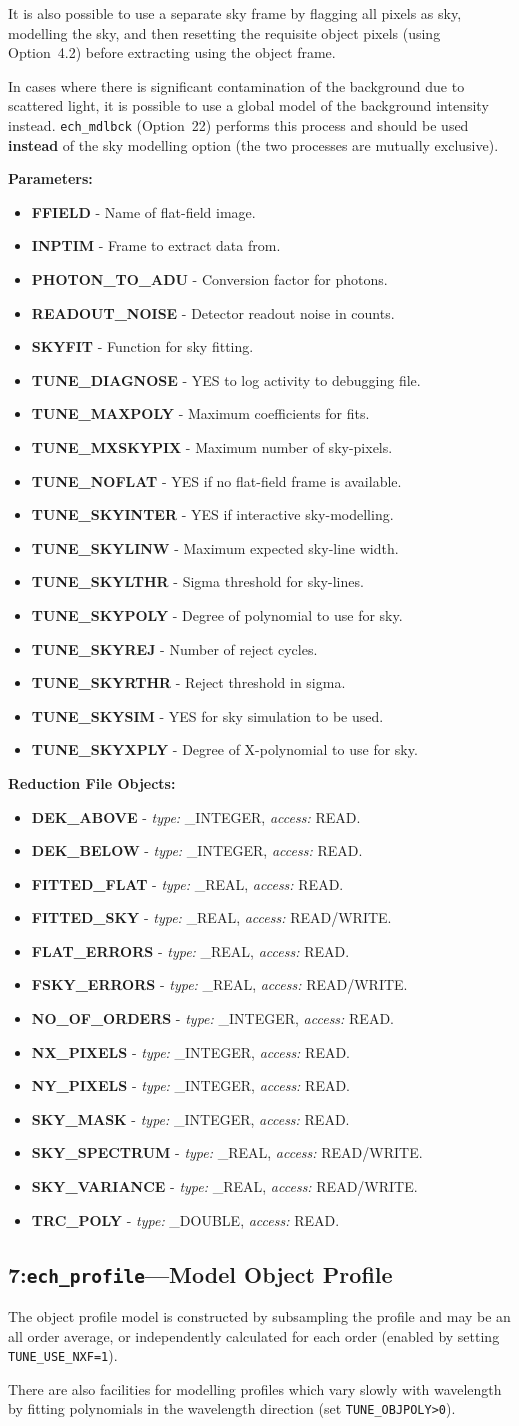 \documentclass[11pt,twoside]{article}
\makeatletter
\newcommand{\stardocinitials}  {SUN}
\newcommand{\stardocnumber}    {152.4}
\newcommand{\stardocname}{\stardocinitials /\stardocnumber}
\newcommand{\htmlref}[2]{#1}
\newcommand{\xlabel}[1]{}
\newcommand{\myindex}[1]{\index{#1}}
\newcommand{\indexcmdname}[1]{\index{#1@\protect\cmdname{#1}}}
\renewcommand{\myindex}[1]{}
\renewcommand{\indexcmdname}[1]{}
\newcommand{\cmdname}{\begingroup \catcode`\_=12 \realcmdname}
\newcommand{\realcmdname}[1]{\endgroup\texttt{#1}}
\newlength{\sstbannerlength}
\newlength{\sstcaptionlength}
\newcommand{\echtask}[4]{
   \goodbreak
   \rule{\textwidth}{0.5mm}
   \vspace{-7ex}
   \newline
   \settowidth{\sstbannerlength}{{\Large {\bf #3}}}
   \setlength{\sstcaptionlength}{\textwidth}
   \addtolength{\sstbannerlength}{0.5em}
   \addtolength{\sstcaptionlength}{-2.0\sstbannerlength}
   \addtolength{\sstcaptionlength}{-5.0pt}
   \parbox[t]{\sstbannerlength}{\flushleft{\Large {\bf #3}}}
   \parbox[t]{\sstcaptionlength}{\center{\Large #4}}
   \parbox[t]{\sstbannerlength}{\flushright{\Large {\bf #3}}}
   \label{#1}\label{#2}
   \markboth{#3}{\stardocname}
   \uppercase{\myindex{#2@\protect\cmdname{#2}}}
}
\renewcommand{\echtask}[4]
{
  \subsection{\xlabel{#1}\xlabel{#2}\label{#1}\label{#2}#3---#4}
  \markboth{#3}{\stardocname}
}
\newcommand{\echpars}[1]{
{\bf Parameters:\vspace*{6pt}\\}
    #1
}
\renewcommand{\echpars}[1]{
{\bf Parameters:}
\begin{itemize}
#1
\end{itemize}
}
\newcommand{\epar}[3]
{
    \hspace*{5mm}\makebox[50mm][l]{\bf #1} #2 (p~\pageref{par_#3}.)\\
}
\renewcommand{\epar}[3]
{\item \htmlref{{\bf #1}}{par_#3} - #2}
\newcommand{\lepar}[3]
{
    \hspace*{5mm}\makebox[50mm][l]{\bf #1} #2 (p~\pageref{par_#3}.)
}
\renewcommand{\lepar}[3]
{\item \htmlref{{\bf #1}}{par_#3} - #2}
\newcommand{\echredobj}[1]{
{\bf Reduction File Objects:\vspace*{6pt}\\}
      \hspace*{5mm}\makebox[50mm][l]{Object}\makebox[25mm][l]{Type}{Access}\\
      #1
}
\renewcommand{\echredobj}[1]{
{\bf Reduction File Objects:}
\begin{itemize}
#1
\end{itemize}
}
\newcommand{\eobj}[3]
{
    \hspace*{5mm}\makebox[50mm][l]{\bf #1}\makebox[25mm][l]{\tt #2}{\tt #3}\\
}
\renewcommand{\eobj}[3]
{\item {\bf #1} - {\it type:} #2, {\it access:} #3.}
\newcommand{\leobj}[3]
{
    \hspace*{5mm}\makebox[50mm][l]{\bf #1}\makebox[25mm][l]{\tt #2}{\tt #3}
}
\renewcommand{\leobj}[3]
{\item {\bf #1} - {\it type:} #2, {\it access:} #3.}
\makeatother
\begin{document}
It is also possible to use a separate sky frame by flagging all pixels
as sky, modelling the sky, and then resetting the requisite
object pixels (using Option~4.2) before extracting using the object
frame.

In cases where there is significant contamination of the background due
to scattered light, it is possible to use a global model of the
background intensity instead. \htmlref{{\tt ech\_mdlbck}
(Option~22)}{ech_mdlbck} performs this
process and should be used {\bf instead} of the sky modelling option
(the two processes are mutually exclusive).

\echpars{
\epar{FFIELD}{Name of flat-field image.}{FFIELD}
\epar{INPTIM}{Frame to extract data from.}{INPTIM}
\epar{PHOTON\_TO\_ADU}{Conversion factor for photons.}{PHOTON_TO_ADU}
\epar{READOUT\_NOISE}{Detector readout noise in counts.}{READOUT_NOISE}
\epar{SKYFIT}{Function for sky fitting.}{SKYFIT}
\epar{TUNE\_DIAGNOSE}{YES to log activity to debugging file.}{TUNE_DIAGNOSE}
\epar{TUNE\_MAXPOLY}{Maximum coefficients for fits.}{TUNE_MAXPOLY}
\epar{TUNE\_MXSKYPIX}{Maximum number of sky-pixels.}{TUNE_MXSKYPIX}
\epar{TUNE\_NOFLAT}{YES if no flat-field frame is available.}{TUNE_NOFLAT}
\epar{TUNE\_SKYINTER}{YES if interactive sky-modelling.}{TUNE_SKYINTER}
\epar{TUNE\_SKYLINW}{Maximum expected sky-line width.}{TUNE_SKYLINW}
\epar{TUNE\_SKYLTHR}{Sigma threshold for sky-lines.}{TUNE_SKYLTHR}
\epar{TUNE\_SKYPOLY}{Degree of polynomial to use for sky.}{TUNE_SKYPOLY}
\epar{TUNE\_SKYREJ}{Number of reject cycles.}{TUNE_SKYREJ}
\epar{TUNE\_SKYRTHR}{Reject threshold in sigma.}{TUNE_SKYRTHR}
\epar{TUNE\_SKYSIM}{YES for sky simulation to be used.}{TUNE_SKYSIM}
\lepar{TUNE\_SKYXPLY}{Degree of X-polynomial to use for sky.}{TUNE_SKYXPLY}
}


\echredobj{
\eobj{DEK\_ABOVE}{\_INTEGER}{READ}
\eobj{DEK\_BELOW}{\_INTEGER}{READ}
\eobj{FITTED\_FLAT}{\_REAL}{READ}
\eobj{FITTED\_SKY}{\_REAL}{READ/WRITE}
\eobj{FLAT\_ERRORS}{\_REAL}{READ}
\eobj{FSKY\_ERRORS}{\_REAL}{READ/WRITE}
\eobj{NO\_OF\_ORDERS}{\_INTEGER}{READ}
\eobj{NX\_PIXELS}{\_INTEGER}{READ}
\eobj{NY\_PIXELS}{\_INTEGER}{READ}
\eobj{SKY\_MASK}{\_INTEGER}{READ}
\eobj{SKY\_SPECTRUM}{\_REAL}{READ/WRITE}
\eobj{SKY\_VARIANCE}{\_REAL}{READ/WRITE}
\leobj{TRC\_POLY}{\_DOUBLE}{READ}
}

\echtask{option7}{ech_profile}{7:{\tt ech\_profile}}{Model Object Profile}
\myindex{Object profile}
\myindex{Spatial profile}

The object profile model is constructed by subsampling the profile and may
be an all order average, or independently calculated for each order
(enabled by setting \verb+TUNE_USE_NXF=1+).
\indexcmdname{TUNE_USE_NXF}
\indexcmdname{TUNE_OBJPOLY}
There are also facilities for modelling profiles which vary slowly with
wavelength by fitting polynomials in the wavelength direction (set
\htmlref{{\tt TUNE\_OBJPOLY>0}}{par_TUNE_OBJPOLY}).
\end{document}
